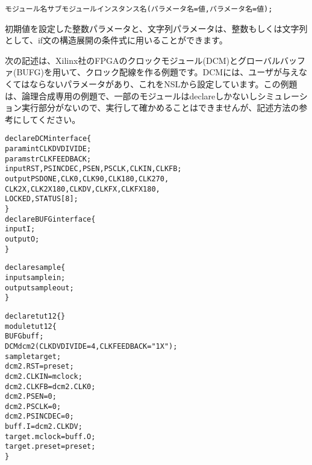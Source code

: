 \begin{reviewemlist}
\begin{alltt}
モジュール名 サブモジュールインスタンス名(パラメータ名=値, パラメータ名=値) ;
\end{alltt}
\end{reviewemlist}

初期値を設定した整数パラメータと、文字列パラメータは、整数もしくは文字列として、if文の構造展開の条件式に用いることができます。

次の記述は、Xilinx社のFPGAのクロックモジュール(DCM)とグローバルバッファ(BUFG)を用いて、クロック配線を作る例題です。DCMには、ユーザが与えなくてはならないパラメータがあり、これをNSLから設定しています。この例題は、論理合成専用の例題で、一部のモジュールはdeclareしかないしシミュレーション実行部分がないので、実行して確かめることはできませんが、記述方法の参考にしてください。

\begin{reviewlist}
\begin{alltt}
declare DCM interface \{
param\textunderscore{}int CLKDV\textunderscore{}DIVIDE;
param\textunderscore{}str CLK\textunderscore{}FEEDBACK;
input RST, PSINCDEC, PSEN, PSCLK, CLKIN, CLKFB;
output PSDONE, CLK0, CLK90, CLK180, CLK270,
 CLK2X, CLK2X180, CLKDV, CLKFX, CLKFX180,
 LOCKED, STATUS[8];
\}
declare BUFG interface \{
input I;
output O;
\}

declare sample \{
input samplein;
output sampleout;
\}

declare tut12 \{\}
module tut12 \{
BUFG buff;
DCM dcm2(CLKDV\textunderscore{}DIVIDE=4, CLK\textunderscore{}FEEDBACK="1X");
sample target;
dcm2.RST = p\textunderscore{}reset;
dcm2.CLKIN = m\textunderscore{}clock;
dcm2.CLKFB = dcm2.CLK0;
dcm2.PSEN = 0;
dcm2.PSCLK = 0;
dcm2.PSINCDEC =0;
buff.I = dcm2.CLKDV;
target.m\textunderscore{}clock = buff.O;
target.p\textunderscore{}reset = p\textunderscore{}reset;
\}
\end{alltt}
\end{reviewlist}

